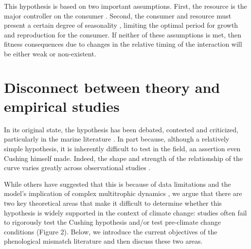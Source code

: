 \documentclass[11pt,letterpaper]{article}
\begin{document}
This hypothesis is based on two important assumptions. First, the resource is the major controller on the consumer \citep[i.e., strong interaction strength, bottom-up control;][] {cury2003}. Second, the consumer and resource must present a certain degree of seasonality \citep[e.g., resource is only available for part of the year;][]{durant2005, durant2007}, limiting the optimal period for growth and reproduction for the consumer. If neither of these assumptions is met, then fitness consequences due to changes in the relative timing of the interaction will be either weak or non-existent. \par

\section{Disconnect between theory and empirical studies}
In its original state, the hypothesis has been debated, contested and criticized, particularly in the marine literature \citep{leggett1994, durant2007}. In part because, although a relatively simple hypothesis, it is inherently difficult to test in the field, an assertion even Cushing himself made. Indeed, the shape and strength of the relationship of the curve varies greatly across observational studies \citep[e.g.,][]{philippart2003, reed2013a, plard2014, atkinson2015}. \par

While others have suggested that this is because of data limitations and the model’s implication of complex multitrophic dynamics \citep{durant2007, kerby2012}, we argue that there are two key theoretical areas that make it difficult to determine whether this hypothesis is widely supported in the context of climate change: studies often fail to rigorously test the Cushing hypothesis and/or test pre-climate change conditions (Figure 2). Below, we introduce the current objectives of the phenological mismatch literature and then discuss these two areas.\par
\end{document}

